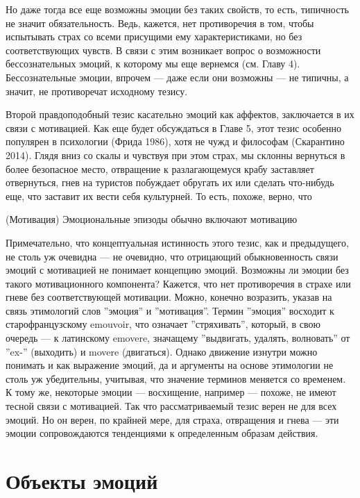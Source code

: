 \documentclass[11pt]{book}
\begin{document}
Но даже тогда все еще возможны эмоции без таких свойств, то есть, типичность не значит обязательность. Ведь, кажется, нет противоречия в том, чтобы испытывать страх со всеми присущими ему характеристиками, но без соответствующих чувств. В связи с этим возникает вопрос о возможности бессознательных эмоций, к которому мы еще вернемся (см. Главу 4). Бессознательные эмоции, впрочем --- даже если они возможны --- не типичны, а значит, не противоречат исходному тезису.

Второй правдоподобный тезис касательно эмоций как аффектов, заключается в их связи с мотивацией. Как еще будет обсуждаться в Главе 5, этот тезис особенно популярен в психологии (Фрида 1986), хотя не чужд и философам (Скарантино 2014). Глядя вниз со скалы и чувствуя при этом страх, мы склонны вернуться в более безопасное место, отвращение к разлагающемуся крабу заставляет отвернуться, гнев на туристов побуждает обругать их или сделать что-нибудь еще, что заставит их вести себя культурней. То есть, похоже, верно, что

\smallskip

(Мотивация) Эмоциональные эпизоды обычно включают мотивацию

\smallskip

Примечательно, что концептуальная истинность этого тезис, как и предыдущего, не столь уж очевидна --- не очевидно, что отрицающий обыкновенность связи эмоций с мотивацией не понимает концепцию эмоций. Возможны ли эмоции без такого мотивационного компонента? Кажется, что нет противоречия в страхе или гневе без соответствующей мотивации. Можно, конечно возразить, указав на связь этимологий слов ''эмоция'' и ''мотивация''. Термин ''эмоция'' восходит к старофранцузскому emouvoir, что означает ''стряхивать'', который, в свою очередь --- к латинскому emovere, значащему ''выдвигать, удалять, волновать'' от ''ex-'' (выходить) и movere (двигаться). Однако движение изнутри можно понимать и как выражение эмоций, да и аргументы на основе этимологии не столь уж убедительны, учитывая, что значение терминов меняется со временем. К тому же, некоторые эмоции --- восхищение, например --- похоже, не имеют тесной связи с мотивацией. Так что рассматриваемый тезис верен не для всех эмоций. Но он верен, по крайней мере, для страха, отвращения и гнева --- эти эмоции сопровождаются тенденциями к определенным образам действия.

\section{Объекты эмоций}
\end{document}

